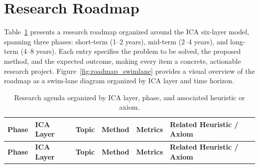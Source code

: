 \section{Research Roadmap}
\label{sec:roadmap}

Table~\ref{tab:roadmap} presents a research roadmap organized around the ICA six-layer model, spanning three phases: short-term (1--2 years), mid-term (2--4 years), and long-term (4--8 years). Each entry specifies the problem to be solved, the proposed method, and the expected outcome, making every item a concrete, actionable research project. Figure~\ref{fig:roadmap_swimlane} provides a visual overview of the roadmap as a swim-lane diagram organized by ICA layer and time horizon.

\footnotesize
\renewcommand{\arraystretch}{1.35}
\begin{longtable}{>{\small}p{}>{\small}p{}>{\small}p{}>{\small}p{}>{\small}p{}>{\small}p{}}
\caption{Research agenda organized by ICA layer, phase, and associated heuristic or axiom.}
\label{tab:roadmap}\\
\toprule
\textbf{Phase} & \textbf{ICA Layer} & \textbf{Topic} & \textbf{Method} & \textbf{Metrics} & \textbf{Related Heuristic / Axiom} \\
\midrule
\endfirsthead
\toprule
\textbf{Phase} & \textbf{ICA Layer} & \textbf{Topic} & \textbf{Method} & \textbf{Metrics} & \textbf{Related Heuristic / Axiom} \\
\midrule
\endhead


\end{longtable}
